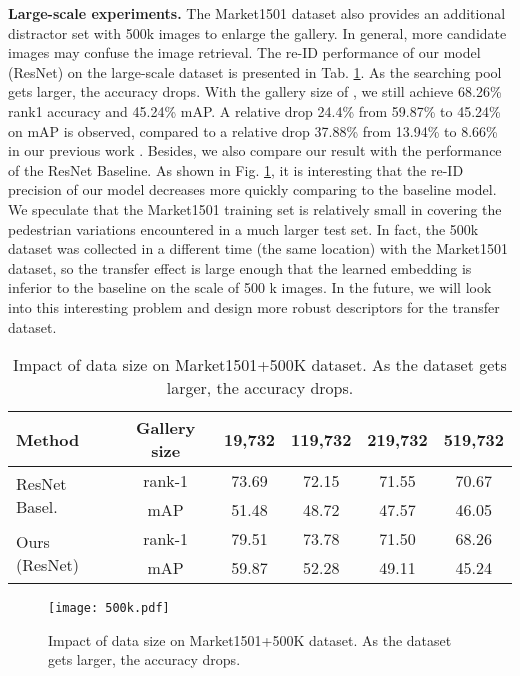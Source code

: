 \documentclass[journal]{IEEEtran}
\begin{document}
\textbf{Large-scale experiments.}
The Market1501 dataset also provides an additional distractor set with 500k images  to enlarge the gallery. In general, more candidate images may confuse the image retrieval. The re-ID performance of our model (ResNet) on the large-scale dataset is presented in Tab. \ref{table:bigdata}. As the searching pool gets larger, the accuracy drops. With the gallery size of , we still achieve 68.26\% rank1 accuracy and 45.24\% mAP. A relative drop 24.4\% from 59.87\% to 45.24\% on mAP is observed, compared to a relative drop 37.88\% from 13.94\% to 8.66\% in our previous work \cite{zheng2015scalable}. Besides, we also compare our result with the performance of the ResNet Baseline. As shown in Fig. \ref{fig:500k}, it is interesting that the re-ID precision of our model decreases more quickly comparing to the baseline model. We speculate that the Market1501 training set is relatively small in covering the pedestrian variations encountered in a much larger test set. In fact, the 500k dataset was collected in a different time (the same location) with the Market1501 dataset, so the transfer effect is large enough that the learned embedding is inferior to the baseline on the scale of 500 k images. In the future, we will look into this interesting problem and design more robust descriptors for the transfer dataset. 
\setlength{\tabcolsep}{5pt}
\begin{table}
\begin{center}
\footnotesize
\begin{tabular}{l|ccccc}
\hline
Method&Gallery size & 19,732 & 119,732 & 219,732 & 519,732\\
\hline
\multirow{2}{*}{ResNet Basel.}&rank-1 & 73.69 & 72.15 & 71.55 & 70.67\\ 
&mAP & 51.48 & 48.72 & 47.57 & 46.05\\
\hline
\multirow{2}{*}{Ours (ResNet)}&rank-1 & 79.51 & 73.78 & 71.50 & 68.26\\ 
&mAP & 59.87 & 52.28 & 49.11 & 45.24 \\
\hline
\end{tabular}
\end{center}
\caption{Impact of data size on Market1501+500K dataset. As the dataset gets larger, the accuracy drops.}
\label{table:bigdata}
\end{table}

\begin{figure}[t]
\begin{center}
\texttt{[image: 500k.pdf]}
\end{center}
   \caption{Impact of data size on Market1501+500K dataset. As the dataset gets larger, the accuracy drops.}
\label{fig:500k}
\end{figure}
\end{document}
